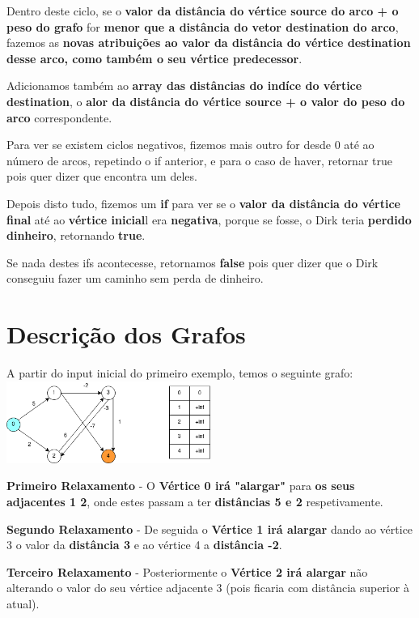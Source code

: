 \documentclass[11pt]{article}   %
\begin{document}
Dentro deste ciclo, se o \textbf{valor da distância do vértice source do arco + o peso do grafo} for \textbf{menor que a distância do vetor destination do arco}, fazemos as \textbf{novas atribuições ao valor da distância do vértice destination desse arco, como também o seu vértice predecessor}.

Adicionamos também ao \textbf{array das distâncias do indíce do vértice destination}, o \textbf{alor da distância do vértice source + o valor do peso do arco} correspondente.

Para ver se existem ciclos negativos, fizemos mais outro for desde 0 até ao número de arcos, repetindo o if anterior, e para o caso de haver, retornar true pois quer dizer que encontra um deles.

Depois disto tudo, fizemos um \textbf{if} para ver se o \textbf{valor da distância do vértice final} até ao \textbf{vértice inicial}l era \textbf{negativa}, porque se fosse, o Dirk teria \textbf{perdido dinheiro}, retornando \textbf{true}.

Se nada destes ifs acontecesse, retornamos \textbf{false} pois quer dizer que o Dirk conseguiu fazer um caminho sem perda de dinheiro.\\
\section{Descrição dos Grafos}
\hspace{0,5cm}A partir do input inicial do primeiro exemplo, temos o seguinte grafo:\\
\includegraphics[width=0.5\textwidth]{images/grafo_inicial.png}

\textbf{Primeiro Relaxamento} - O \textbf{Vértice 0 irá "alargar"} para \textbf{os seus adjacentes 1 2}, onde estes passam a ter \textbf{distâncias 5 e 2} respetivamente.

\textbf{Segundo Relaxamento} - De seguida o \textbf{Vértice 1 irá alargar} dando ao vértice 3 o valor da  \textbf{distância 3} e ao vértice 4 a \textbf{distância -2}.

\textbf{Terceiro Relaxamento} - Posteriormente o \textbf{Vértice 2 irá alargar} não alterando o valor do seu vértice adjacente 3 (pois ficaria com distância superior à atual).
\end{document}
